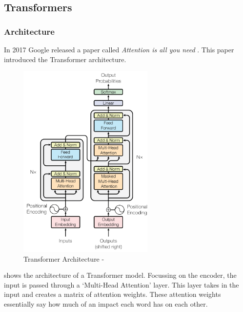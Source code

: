 \subsection{Transformers}
\label{sec:transformers}
\subsubsection{Architecture}
In 2017 Google released a paper called \textit{Attention is all you need} \cite{attention}. This paper introduced the Transformer
architecture.
\newpage
\begin{figure}[hbtp]
    \centering
    \includegraphics[width=0.6\textwidth]{../images/transformer.png}
    \caption{Transformer Architecture - \cite{attention}}
    \label{fig:transformer}
\end{figure}

 shows the architecture of a Transformer model. Focussing on the encoder, the input is passed through
a `Multi-Head Attention' layer. This layer takes in the input and creates a matrix of attention weights. These attention weights
essentially say how much of an impact each word has on each other.
